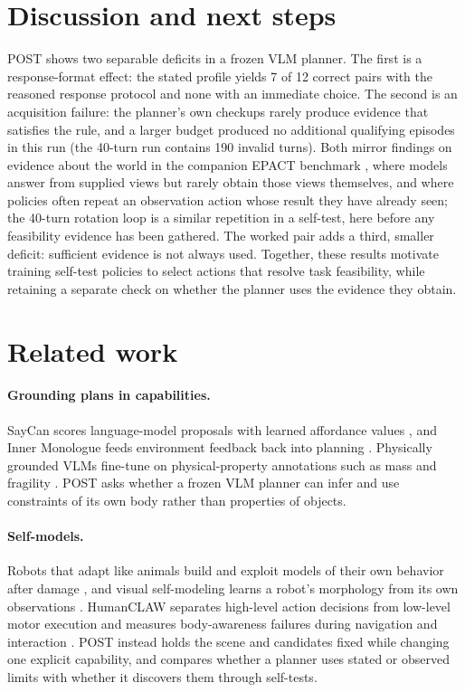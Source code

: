 \documentclass{article}
\begin{document}
\section{Discussion and next steps}
POST shows two separable deficits in a frozen VLM planner. The first is a response-format effect: the stated profile yields 7 of 12 correct pairs with the reasoned response protocol and none with an immediate choice. The second is an acquisition failure: the planner's own checkups rarely produce evidence that satisfies the rule, and a larger budget produced no additional qualifying episodes in this run (the 40-turn run contains 190 invalid turns). Both mirror findings on evidence about the world in the companion EPACT benchmark \citep{yang2026epact}, where models answer from supplied views but rarely obtain those views themselves, and where policies often repeat an observation action whose result they have already seen; the 40-turn rotation loop is a similar repetition in a self-test, here before any feasibility evidence has been gathered. The worked pair adds a third, smaller deficit: sufficient evidence is not always used. Together, these results motivate training self-test policies to select actions that resolve task feasibility, while retaining a separate check on whether the planner uses the evidence they obtain.

\section{Related work}
\paragraph{Grounding plans in capabilities.} SayCan scores language-model proposals with learned affordance values \citep{ahn2022saycan}, and Inner Monologue feeds environment feedback back into planning \citep{huang2022inner}. Physically grounded VLMs fine-tune on physical-property annotations such as mass and fragility \citep{gao2024physically}. POST asks whether a frozen VLM planner can infer and use constraints of its own body rather than properties of objects.

\paragraph{Self-models.} Robots that adapt like animals build and exploit models of their own behavior after damage \citep{cully2015robots}, and visual self-modeling learns a robot's morphology from its own observations \citep{chen2022fullbody}. HumanCLAW separates high-level action decisions from low-level motor execution and measures body-awareness failures during navigation and interaction \citep{li2026humanclaw}. POST instead holds the scene and candidates fixed while changing one explicit capability, and compares whether a planner uses stated or observed limits with whether it discovers them through self-tests.
\end{document}
